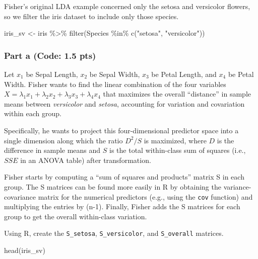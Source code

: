 \documentclass[
]{article}
\newenvironment{Shaded}{\begin{snugshade}}{\end{snugshade}}
\newcommand{\FunctionTok}[1]{\textcolor[rgb]{0.00,0.00,0.00}{#1}}
\newcommand{\NormalTok}[1]{#1}
\newcommand{\OtherTok}[1]{\textcolor[rgb]{0.56,0.35,0.01}{#1}}
\newcommand{\SpecialCharTok}[1]{\textcolor[rgb]{0.00,0.00,0.00}{#1}}
\newcommand{\StringTok}[1]{\textcolor[rgb]{0.31,0.60,0.02}{#1}}
\begin{document}
Fisher's original LDA example concerned only the setosa and versicolor
flowers, so we filter the iris dataset to include only those species.

\begin{Shaded}
\begin{Highlighting}[]
\NormalTok{iris\_sv }\OtherTok{\textless{}{-}}\NormalTok{ iris }\SpecialCharTok{\%\textgreater{}\%} \FunctionTok{filter}\NormalTok{(Species }\SpecialCharTok{\%in\%} \FunctionTok{c}\NormalTok{(}\StringTok{"setosa"}\NormalTok{, }\StringTok{"versicolor"}\NormalTok{))}
\end{Highlighting}
\end{Shaded}

\hypertarget{part-a-code-1.5-pts}{%
\subsubsection{Part a (Code: 1.5 pts)}\label{part-a-code-1.5-pts}}

Let \(x_1\) be Sepal Length, \(x_2\) be Sepal Width, \(x_3\) be Petal
Length, and \(x_4\) be Petal Width. Fisher wants to find the linear
combination of the four variables
\(X = \lambda_1 x_1 + \lambda_2 x_2 + \lambda_3 x_3 + \lambda_4 x_4\)
that maximizes the overall ``distance'' in sample means between
\emph{versicolor} and \emph{setosa}, accounting for variation and
covariation within each group.

Specifically, he wants to project this four-dimensional predictor space
into a single dimension along which the ratio \(D^2/S\) is maximized,
where \(D\) is the difference in sample means and \(S\) is the total
within-class sum of squares (i.e., \(SSE\) in an ANOVA table) after
transformation.

Fisher starts by computing a ``sum of squares and products'' matrix S in
each group. The S matrices can be found more easily in R by obtaining
the variance-covariance matrix for the numerical predictors (e.g., using
the \texttt{cov} function) and multiplying the entries by (n-1).
Finally, Fisher adds the S matrices for each group to get the overall
within-class variation.

Using R, create the \texttt{S\_setosa}, \texttt{S\_versicolor}, and
\texttt{S\_overall} matrices.

\begin{Shaded}
\begin{Highlighting}[]
\FunctionTok{head}\NormalTok{(iris\_sv)}
\end{Highlighting}
\end{Shaded}
\end{document}
